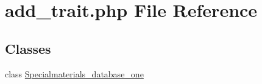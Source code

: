 \hypertarget{add__trait_8php}{\section{add\+\_\+trait.\+php File Reference}
\label{add__trait_8php}
}
\subsection*{Classes}
\begin{DoxyCompactItemize}
\item 
class \hyperlink{classSpecialmaterials__database__one}{Specialmaterials\+\_\+database\+\_\+one}
\end{DoxyCompactItemize}
